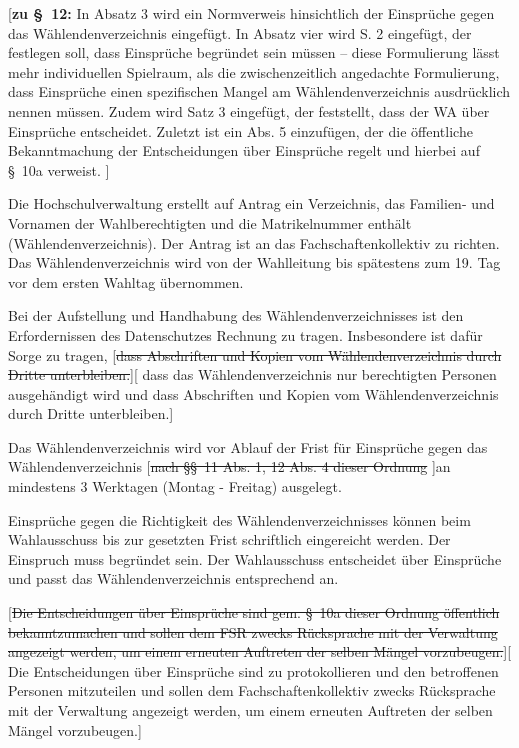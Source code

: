 \documentclass[%
draft,%
multilinesections%
]{fswo}
\newcommand\oldT[1]  {{\color{Gray}[\st{#1}]}}
\newcommand\newT[1]  {{\color{Green}[#1]}}
\newcommand\bemFr[1] {{\color{Red}[#1]}}
\newcommand\oldT[1]{}%
\newcommand\newT[1]{#1}
\newcommand\bemFr[1]{}%
\newcommand\change[2]{\oldT{#1}\newT{#2}}
\begin{document}
\bemFr{\textbf{zu \S~12:}
In Absatz 3 wird ein Normverweis hinsichtlich der Einsprüche gegen das Wählendenverzeichnis eingefügt.
In Absatz vier wird S. 2 eingefügt, der festlegen soll, dass Einsprüche begründet sein müssen
– diese Formulierung lässt mehr individuellen Spielraum, als die zwischenzeitlich angedachte Formulierung,
dass Einsprüche einen spezifischen Mangel am Wählendenverzeichnis ausdrücklich nennen müssen.
Zudem wird Satz 3 eingefügt, der feststellt, dass der WA über Einsprüche entscheidet.
Zuletzt ist ein Abs. 5 einzufügen, der die öffentliche Bekanntmachung der Entscheidungen über Einsprüche regelt und hierbei auf \S~10a verweist.
}

\begin{contract}
Die Hochschulverwaltung erstellt auf Antrag ein Verzeichnis, das Familien- und Vornamen der Wahlberechtigten und die Matrikelnummer enthält (Wählendenverzeichnis).
Der Antrag ist an das Fachschaftenkollektiv zu richten.
Das Wählendenverzeichnis wird von der Wahlleitung bis spätestens zum 19. Tag vor dem ersten Wahltag übernommen.

Bei der Aufstellung und Handhabung des Wählendenverzeichnisses ist den Erfordernissen des Datenschutzes Rechnung zu tragen.
Insbesondere ist dafür Sorge zu tragen,
\change{dass Abschriften und Kopien vom Wählendenverzeichnis durch Dritte unterbleiben.}{%
dass das Wählendenverzeichnis nur berechtigten Personen ausgehändigt wird und dass Abschriften und Kopien vom Wählendenverzeichnis durch Dritte unterbleiben.}

Das Wählendenverzeichnis wird vor Ablauf der Frist für Einsprüche gegen das Wählendenverzeichnis \oldT{nach \S\S~11 Abs. 1, 12 Abs. 4 dieser Ordnung }an mindestens 3 Werktagen (Montag - Freitag) ausgelegt.

Einsprüche gegen die Richtigkeit des Wählendenverzeichnisses können beim Wahlausschuss bis zur gesetzten Frist schriftlich eingereicht werden.
Der Einspruch muss begründet sein.
Der Wahlausschuss entscheidet über Einsprüche und passt das Wählendenverzeichnis entsprechend an.

\change{Die Entscheidungen über Einsprüche sind gem. \S~10a dieser Ordnung öffentlich bekanntzumachen und sollen dem FSR zwecks Rücksprache mit der Verwaltung angezeigt werden,
um einem erneuten Auftreten der selben Mängel vorzubeugen.}{%
Die Entscheidungen über Einsprüche sind zu protokollieren und den betroffenen Personen mitzuteilen und sollen dem Fachschaftenkollektiv zwecks Rücksprache mit der Verwaltung angezeigt werden, um einem erneuten Auftreten der selben Mängel vorzubeugen.}
\end{contract}
\end{document}
